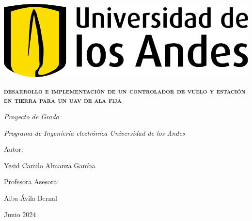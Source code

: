 \documentclass[journal,onecolumn]{IEEEtran}
\date{}
\begin{document}
    \begin{titlepage}
    \centering
    \includegraphics[scale=0.18]{Documentos/logo_uniandes.png}\\

    \vspace{1cm}
    \vspace{3cm}
    {\scshape \Large \textbf{desarrollo e implementación de un controlador de vuelo y estación en tierra para un uav de ala fija } \par}
    \vspace{3cm}
    {\itshape\Large Proyecto de Grado \par}
    \vfill
    {\itshape\Large Programa de Ingeniería electrónica Universidad de los Andes\par}
    {\Large Autor: \par}
    {\Large Yesid Camilo Almanza Gamba \par}
    \vfill
    {\Large Profesora Asesora: \par}
    {\Large Alba Ávila Bernal  \par}
    \vfill
    {\Large Junio 2024 \par}
    \end{titlepage}

\clearpage


\clearpage


\tableofcontents
\clearpage
\makeatletter
\listoffigures
\makeatother
\clearpage
\makeatletter
\listoftables
\makeatother
\clearpage

\clearpage

\clearpage


\clearpage

\clearpage

\clearpage

\clearpage

\clearpage

\clearpage

\clearpage

\clearpage
%
\clearpage 
%
\clearpage

\clearpage

\clearpage
%
\clearpage
%
\clearpage
%
\clearpage
%

\clearpage

\printbibliography
\end{document}
